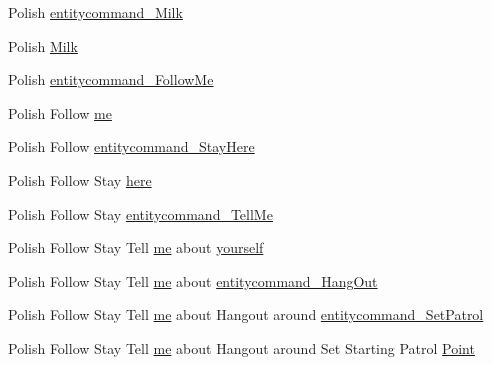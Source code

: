 \begin{DoxyCompactItemize}
\item 
Polish \mbox{\hyperlink{_blooms_01_animal_01_husbandry_2_config_2_localization_8txt_ae4fac992f5dd84058c4d409bb5f31948}{entitycommand\+\_\+\+Milk}}
\item 
Polish \mbox{\hyperlink{_blooms_01_animal_01_husbandry_2_config_2_localization_8txt_ac290faa339c1d3831a1bea6d970ad974}{Milk}}
\item 
Polish \mbox{\hyperlink{_blooms_01_animal_01_husbandry_2_config_2_localization_8txt_a2613e5dfe3a2702fc9e8d599b1590ef5}{entitycommand\+\_\+\+Follow\+Me}}
\item 
Polish Follow \mbox{\hyperlink{_blooms_01_animal_01_husbandry_2_config_2_localization_8txt_aa0011d8b60c7cc57ec5a5a67d8649e30}{me}}
\item 
Polish Follow \mbox{\hyperlink{_blooms_01_animal_01_husbandry_2_config_2_localization_8txt_a4102eec5fe4db37b6c63db1c518dd5e0}{entitycommand\+\_\+\+Stay\+Here}}
\item 
Polish Follow Stay \mbox{\hyperlink{_blooms_01_animal_01_husbandry_2_config_2_localization_8txt_a272c936a28b2414799ff3b2b3cc5f913}{here}}
\item 
Polish Follow Stay \mbox{\hyperlink{_blooms_01_animal_01_husbandry_2_config_2_localization_8txt_a031f7180bf4823a7f4da7cbc05fb3d8f}{entitycommand\+\_\+\+Tell\+Me}}
\item 
Polish Follow Stay Tell \mbox{\hyperlink{_blooms_01_animal_01_husbandry_2_config_2_localization_8txt_a290fbecf7c016b09bc675718400d6fca}{me}} about \mbox{\hyperlink{_blooms_01_animal_01_husbandry_2_config_2_localization_8txt_a919303dabda3da26b4f85a616c655c07}{yourself}}
\item 
Polish Follow Stay Tell \mbox{\hyperlink{_blooms_01_animal_01_husbandry_2_config_2_localization_8txt_a290fbecf7c016b09bc675718400d6fca}{me}} about \mbox{\hyperlink{_blooms_01_animal_01_husbandry_2_config_2_localization_8txt_ac56b48dfdc12eb33d564ae3192862fe8}{entitycommand\+\_\+\+Hang\+Out}}
\item 
Polish Follow Stay Tell \mbox{\hyperlink{_blooms_01_animal_01_husbandry_2_config_2_localization_8txt_a290fbecf7c016b09bc675718400d6fca}{me}} about Hangout around \mbox{\hyperlink{_blooms_01_animal_01_husbandry_2_config_2_localization_8txt_a2edb8eefc1c577dbd1b58ed8023807eb}{entitycommand\+\_\+\+Set\+Patrol}}
\item 
Polish Follow Stay Tell \mbox{\hyperlink{_blooms_01_animal_01_husbandry_2_config_2_localization_8txt_a290fbecf7c016b09bc675718400d6fca}{me}} about Hangout around Set Starting Patrol \mbox{\hyperlink{_blooms_01_animal_01_husbandry_2_config_2_localization_8txt_ae97f634308ac93fb3604e2f908af006e}{Point}}

\end{DoxyCompactItemize}
